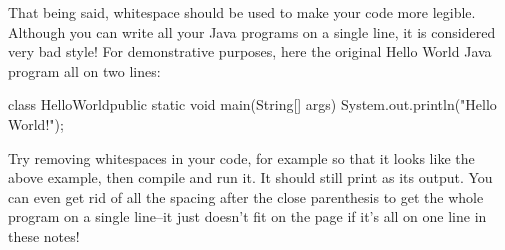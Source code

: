 That being said, whitespace should be used to make your code more legible. Although you can write all your Java programs on a single line, it is considered very bad style!
For demonstrative purposes, here the original Hello World Java program all on two lines:
\begin{code}
class HelloWorld{public static void main(String[] args)
    {System.out.println("Hello World!");}}
\end{code}
Try removing whitespaces in your code, for example so that it looks like the above example, then compile and run it. It should still print  as its output. You can even get rid of all the spacing after the close parenthesis \ic{)} to get the whole program on a single line--it just doesn't fit on the page if it's all on one line in these notes!
